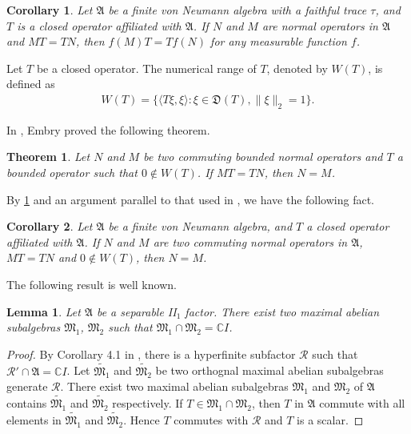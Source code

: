 \documentclass[a4paper,10pt]{amsart}
\newtheorem{theorem}{Theorem}[section]
\newtheorem{corollary}{Corollary}[section]
\newtheorem{lemma}{Lemma}[section]
\newcommand{\AAA}{\mathfrak A}
\newcommand{\C}{\mathbb C} %
\begin{document}
\begin{corollary}\label{fcor4}
    Let $\AAA$ be a finite von Neumann algebra with a faithful trace $\tau$,
    and $T$ is a closed operator affiliated with $\AAA$. 
    If $N$ and $M$ are  normal operators in $\AAA$ and $MT = TN$, then
    $f(M)T = Tf(N)$ for any measurable function $f$.
\end{corollary}

Let $T$ be a closed operator. The numerical range of $T$, denoted by $W(T)$,
is defined as
\begin{align*}
    W(T) = \{\langle T\xi, \xi \rangle: \xi \in \mathfrak{D}(T), \|\xi \|_2 = 1 \}. 
\end{align*}

In \cite{Em}, Embry proved the following theorem.
\begin{theorem}
   Let $N$ and $M$ be two commuting bounded normal operators and $T$ a bounded
   operator such that $0 \notin W(T)$. If $MT = TN$, then $N = M$. 
\end{theorem}

By \cref{fcor4} and an argument parallel to that used in \cite{Em}, we have 
the following fact.

\begin{corollary}\label{fcor5}
    Let $\AAA$ be a finite von Neumann algebra,
    and $T$ a closed operator affiliated with $\AAA$. 
    If $N$ and $M$ are two commuting normal operators in 
    $\AAA$, $MT = TN$ and $0 \notin W(T)$, 
    then $N = M$.
\end{corollary}

The following result is well known.

\begin{lemma} \label{flam3}
    Let $\AAA$ be a separable II$_1$ factor. There exist two
    maximal abelian subalgebras $\mathfrak{M}_1$, $\mathfrak{M}_2$ such
    that $\mathfrak{M}_1 \cap \mathfrak{M}_2 =  \C I$.
\end{lemma}

\begin{proof}
    By Corollary 4.1 in \cite{P}, there is a hyperfinite subfactor $\mathcal{R}$
    such that $\mathcal{R}' \cap \AAA = \C I$. Let 
    $\widetilde{\mathfrak{M}_1}$ and $\widetilde{\mathfrak{M}_2}$ 
    be two orthognal maximal abelian
    subalgebras generate $\mathcal{R}$. 
    There exist two maximal abelian subalgebras 
    $\mathfrak{M}_1$ and $\mathfrak{M}_2$ of $\AAA$ contains
    $\widetilde{\mathfrak{M}_1}$ and $\widetilde{\mathfrak{M}_2}$
    respectively. If $T \in \mathfrak{M}_1 \cap \mathfrak{M}_2$,
    then $T$ in $\AAA$ commute with all elements in 
    $\widetilde{\mathfrak{M}_1}$ and $\widetilde{\mathfrak{M}_2}$.
    Hence $T$ commutes with $\mathcal{R}$ and $T$ is a scalar.
\end{proof}
\end{document}
